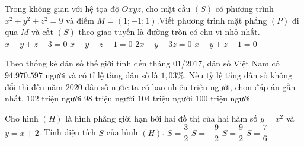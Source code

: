 \begin{ex}%
Trong  không  gian  với  hệ tọa độ  $Oxyz$,  cho  mặt  cầu  $(S)$ có phương trình 
$x^2+y^2+z^2=9$  và  điểm $M=(1; -1;1)$.Viết phương trình mặt phẳng $(P)$ đi qua  $M$  và cắt $(S)$ theo giao tuyến là đường tròn có chu vi nhỏ nhất.
\choice
{$x-y+z-3=0$}
{\True $x-y+z-1=0$}
{$2x-y-3z=0$}
{$x+y+z-1=0$}
\end{ex}

\begin{ex}%
Theo thống kê dân số thế giới tính đến tháng $01$/$2017$, dân số Việt Nam có $94.970.597$ người và có tỉ lệ tăng dân số là $1{,}03\%$. Nếu tỷ lệ tăng dân số không đổi thì đến năm $2020$ dân số nước ta có bao nhiêu triệu người, chọn đáp án gần nhất.
\choice
{$102$ triệu người}
{\True $98$ triệu người}
{$104$ triệu người}
{$100$ triệu người}
\end{ex}

\begin{ex}%
Cho hình $(H)$  là hình phẳng giới hạn bởi hai đồ thị của hai hàm số $y=x^2$ và $y=x+2$. Tính diện tích $S$ của hình $(H)$. 
\choice
{$S=\dfrac{3}{2}$}
{$S=-\dfrac{9}{2}$}
{\True $S=\dfrac{9}{2}$}
{$S=\dfrac{7}{6}$}
\end{ex}

